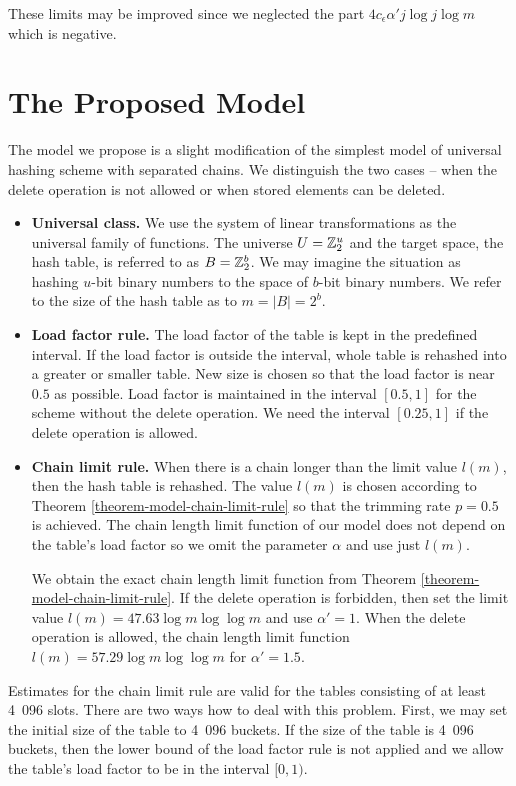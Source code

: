 These limits may be improved since we neglected the part $4 c_\epsilon \alpha' j \log j \log m$ which is negative.

\section{The Proposed Model}
\label{section-proposed-model}
The model we propose is a slight modification of the simplest model of universal hashing scheme with separated chains. We distinguish the two cases -- when the delete operation is not allowed or when stored elements can be deleted.
\begin{itemize}
\item \textbf{Universal class.} We use the system of linear transformations as the universal family of functions. The universe $U = \mathbb{Z}_{2}^{u}$ and the target space, the hash table, is referred to as $B = \mathbb{Z}_{2}^{b}$. We may imagine the situation as hashing $u$-bit binary numbers to the space of $b$-bit binary numbers. We refer to the size of the hash table as to $m = |B| = 2 ^ b$.

\item \textbf{Load factor rule.} The load factor of the table is kept in the predefined interval. If the load factor is outside the interval, whole table is rehashed into a greater or smaller table. New size is chosen so that the load factor is near $0.5$ as possible. Load factor is maintained in the interval $\left[0.5, 1\right]$ for the scheme without the delete operation. We need the interval $\left[0.25, 1\right]$ if the delete operation is allowed.

\item \textbf{Chain limit rule.} When there is a chain longer than the limit value $l(m)$, then the hash table is rehashed. The value $l(m)$ is chosen according to Theorem \ref{theorem-model-chain-limit-rule} so that the trimming rate $p = 0.5$ is achieved. The chain length limit function of our model does not depend on the table's load factor so we omit the parameter $\alpha$ and use just $l(m)$.

We obtain the exact chain length limit function from Theorem \ref{theorem-model-chain-limit-rule}. If the delete operation is forbidden, then set the limit value $l(m) = 47.63 \log m \log \log m$ and use $\alpha' = 1$. When the delete operation is allowed, the chain length limit function $l(m) = 57.29 \log m \log \log m$ for $\alpha' = 1.5$.
\end{itemize}

Estimates for the chain limit rule are valid for the tables consisting of at least 4~096 slots. There are two ways how to deal with this problem. First, we may set the initial size of the table to 4~096 buckets. If the size of the table is 4~096 buckets, then the lower bound of the load factor rule is not applied and we allow the table's load factor to be in the interval $[0, 1)$.

